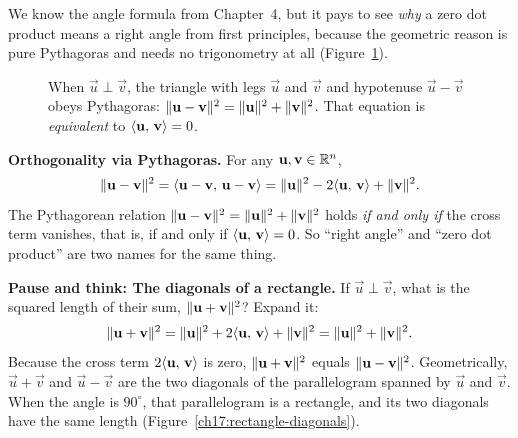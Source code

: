 We know the angle formula from Chapter~4, but it pays to see \emph{why} a zero dot product means a
right angle from first principles, because the geometric reason is pure Pythagoras and needs no
trigonometry at all (Figure~\ref{ch17:pythagoras}).

\begin{figure}[H]
\centering
{}
\caption{When $\vec{u}\perp\vec{v}$, the triangle with legs $\vec{u}$ and $\vec{v}$ and
hypotenuse $\vec{u}-\vec{v}$ obeys Pythagoras: $\lVert\mathbf{u}-\mathbf{v}\rVert^2=\lVert\mathbf{u}\rVert^2+\lVert\mathbf{v}\rVert^2$.
That equation is \emph{equivalent} to $\langle \mathbf{u},\, \mathbf{v} \rangle=0$.}
\label{ch17:pythagoras}
\end{figure}

\begin{formalbox}
\textbf{Orthogonality via Pythagoras.} For any $\mathbf{u},\mathbf{v}\in\mathbb{R}^n$,
\[
  \lVert\mathbf{u}-\mathbf{v}\rVert^2
  = \langle \mathbf{u}-\mathbf{v},\, \mathbf{u}-\mathbf{v} \rangle
  = \lVert\mathbf{u}\rVert^2 - 2\langle \mathbf{u},\, \mathbf{v} \rangle + \lVert\mathbf{v}\rVert^2.
\]
The Pythagorean relation $\lVert\mathbf{u}-\mathbf{v}\rVert^2 = \lVert\mathbf{u}\rVert^2 + \lVert\mathbf{v}\rVert^2$ holds
\emph{if and only if} the cross term vanishes, that is, if and only if
$\langle \mathbf{u},\, \mathbf{v} \rangle=0$. So ``right angle'' and ``zero dot product'' are two names for the
same thing.
\end{formalbox}

\begin{recoverybox}
\textbf{Pause and think: The diagonals of a rectangle.} If $\vec{u}\perp\vec{v}$, what is the
squared length of their sum, $\lVert\mathbf{u}+\mathbf{v}\rVert^2$? Expand it:
\[
  \lVert\mathbf{u}+\mathbf{v}\rVert^2 = \lVert\mathbf{u}\rVert^2 + 2\langle \mathbf{u},\, \mathbf{v} \rangle + \lVert\mathbf{v}\rVert^2
  = \lVert\mathbf{u}\rVert^2 + \lVert\mathbf{v}\rVert^2.
\]
Because the cross term $2\langle \mathbf{u},\, \mathbf{v} \rangle$ is zero, $\lVert\mathbf{u}+\mathbf{v}\rVert^2$ equals
$\lVert\mathbf{u}-\mathbf{v}\rVert^2$. Geometrically, $\vec{u}+\vec{v}$ and $\vec{u}-\vec{v}$ are the two
diagonals of the parallelogram spanned by $\vec{u}$ and $\vec{v}$. When the angle is $90^\circ$,
that parallelogram is a rectangle, and its two diagonals have the same length
(Figure~\ref{ch17:rectangle-diagonals}).
\end{recoverybox}

